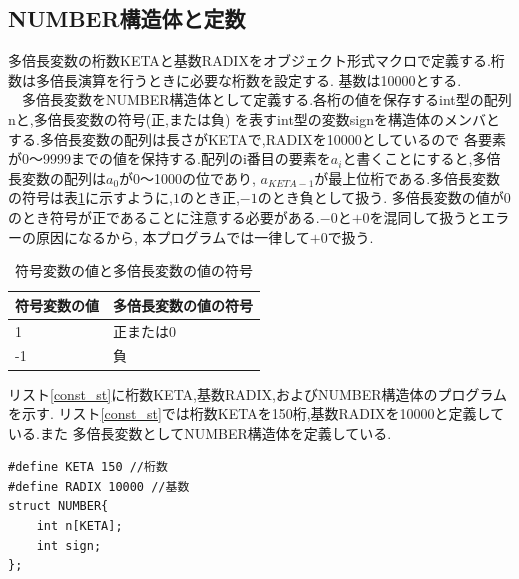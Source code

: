 \documentclass[a4j] {jarticle}
\begin{document}
\subsection{NUMBER構造体と定数}
多倍長変数の桁数KETAと基数RADIXをオブジェクト形式マクロで定義する.桁数は多倍長演算を行うときに必要な桁数を設定する.
基数は10000とする.\\
　多倍長変数をNUMBER構造体として定義する.各桁の値を保存するint型の配列nと,多倍長変数の符号(正,または負)
を表すint型の変数signを構造体のメンバとする.多倍長変数の配列は長さがKETAで,RADIXを10000としているので
各要素が0～9999までの値を保持する.配列のi番目の要素を$a_i$と書くことにすると,多倍長変数の配列は$a_0$が0～1000の位であり,
$a_{KETA-1}$が最上位桁である.多倍長変数の符号は表\ref{sign}に示すように,$1$のとき正,$-1$のとき負として扱う.
多倍長変数の値が$0$のとき符号が正であることに注意する必要がある.$-0$と$+0$を混同して扱うとエラーの原因になるから,
本プログラムでは一律して$+0$で扱う.
\begin{table}[H]
  \caption{符号変数の値と多倍長変数の値の符号}
  \label{sign}
  \begin{center}
      \begin{tabular}{|l|l|}\hline
        符号変数の値 & 多倍長変数の値の符号\\ \hline
      \hline
      1 & 正または0 \\ \hline
      -1 & 負 \\ \hline
      \end{tabular}
  \end{center}
  \end{table}

  リスト\ref{const_st}に桁数KETA,基数RADIX,およびNUMBER構造体のプログラムを示す.
  リスト\ref{const_st}では桁数KETAを150桁,基数RADIXを10000と定義している.また
  多倍長変数としてNUMBER構造体を定義している.
  \begin{lstlisting}[basicstyle=\ttfamily\footnotesize, frame=single,label=const_st,caption=定数とNUMBER構造体のソースコード]
#define KETA 150 //桁数
#define RADIX 10000 //基数
struct NUMBER{
    int n[KETA];
    int sign;
};
  \end{lstlisting}

  
\end{document}
